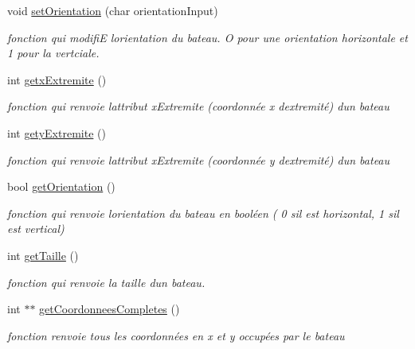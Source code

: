 \begin{DoxyCompactItemize}
void \mbox{\hyperlink{class_bateau_a0c88ac8759c24674a23b7523cb3f6667}{set\+Orientation}} (char orientation\+Input)
\begin{DoxyCompactList}\small\item\em fonction qui modifiE l\textquotesingle{}orientation du bateau. O pour une orientation horizontale et 1 pour la vertciale. \end{DoxyCompactList}\item 
int \mbox{\hyperlink{class_bateau_ad8a7212a50596757a10a429ed69400ce}{getx\+Extremite}} ()
\begin{DoxyCompactList}\small\item\em fonction qui renvoie l\textquotesingle{}attribut x\+Extremite (coordonnée x d\textquotesingle{}extremité) d\textquotesingle{}un bateau \end{DoxyCompactList}\item 
int \mbox{\hyperlink{class_bateau_a326527275685c457dd95fd1a71924b21}{gety\+Extremite}} ()
\begin{DoxyCompactList}\small\item\em fonction qui renvoie l\textquotesingle{}attribut x\+Extremite (coordonnée y d\textquotesingle{}extremité) d\textquotesingle{}un bateau \end{DoxyCompactList}\item 
bool \mbox{\hyperlink{class_bateau_a693e60e6b97d17a04b3f10de4e68f741}{get\+Orientation}} ()
\begin{DoxyCompactList}\small\item\em fonction qui renvoie l\textquotesingle{}orientation du bateau en booléen ( 0 s\textquotesingle{}il est horizontal, 1 s\textquotesingle{}il est vertical) \end{DoxyCompactList}\item 
int \mbox{\hyperlink{class_bateau_a9f0b81c06a5760d0aa40bed0cb9d2a58}{get\+Taille}} ()
\begin{DoxyCompactList}\small\item\em fonction qui renvoie la taille d\textquotesingle{}un bateau. \end{DoxyCompactList}\item 
int $\ast$$\ast$ \mbox{\hyperlink{class_bateau_a55c31fbdc2dc0c92786583d9bbd14985}{get\+Coordonnees\+Completes}} ()
\begin{DoxyCompactList}\small\item\em fonction renvoie tous les coordonnées en x et y occupées par le bateau \end{DoxyCompactList}\end{DoxyCompactItemize}



